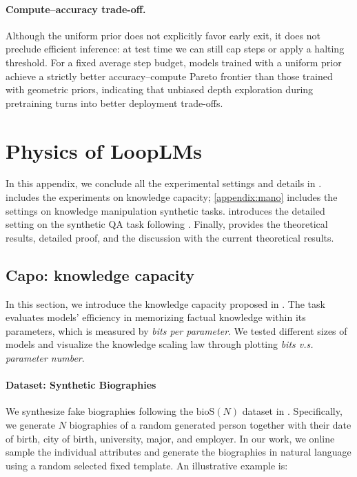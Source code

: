 \documentclass[]{bytedance_seed}
\newcommand{\1}{\mathbf{1}}
\newcommand{\ut}{LoopLM}
\begin{document}
\paragraph{Compute--accuracy trade-off.}
Although the uniform prior does not explicitly favor early exit, it does not preclude efficient inference: at test time we can still cap steps or apply a halting threshold.
For a fixed average step budget, models trained with a uniform prior achieve a strictly better accuracy--compute Pareto frontier than those trained with geometric priors, indicating that unbiased depth exploration during pretraining turns into better deployment trade-offs.
\section{Physics of \ut{}s}
\label{appendix:physics}
In this appendix, we conclude all the experimental settings and details in .  includes the experiments on knowledge capacity; \cref{appendix:mano} includes the settings on knowledge manipulation synthetic tasks.  introduces the detailed setting on the synthetic QA task following \cite{yao2025language}. Finally,  provides the theoretical results, detailed proof, and the discussion with the current theoretical results.
\subsection{Capo: knowledge capacity}
\label{appendix:capo}
In this section, we introduce the knowledge capacity proposed in \cite{AL2024-knowledge3,Allenzhu2025-canon}. The task evaluates models' efficiency in memorizing factual knowledge within its parameters, which is measured by  \textit{bits per parameter}. We tested different sizes of models and visualize the knowledge scaling law through plotting \textit{bits v.s. parameter number}.

\paragraph{Dataset: Synthetic Biographies} We synthesize fake biographies following the $\mathrm{bioS}(N)$ dataset in \cite{AL2024-knowledge3}. Specifically, we generate $N$ biographies of a random generated person together with their date of birth, city of birth, university, major, and employer. In our work, we online sample the individual attributes and generate the biographies in natural language using a random selected fixed template. An illustrative example is:
\end{document}
